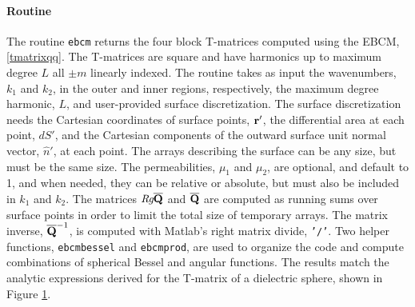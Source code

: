 \begin{figure}[H]
   \label{ebcmcompare}
\end{figure}


\clearpage
\paragraph{Routine}

The routine \texttt{ebcm} returns the four block T-matrices computed using the EBCM, \eqref{tmatrixqq}. The T-matrices are square and have harmonics up to maximum degree $L$ all $\pm m$ linearly indexed. The routine takes as input the wavenumbers, $k_1$ and $k_2$, in the outer and inner regions, respectively, the maximum degree harmonic, $L$, and user-provided surface discretization. The surface discretization needs the Cartesian coordinates of surface points, $\mathbf{r}'$, the differential area at each point, $dS'$, and the Cartesian components of the outward surface unit normal vector, $\hat{n}'$, at each point. The arrays describing the surface can be any size, but must be the same size. The permeabilities, $\mu_1$ and $\mu_2$, are optional, and default to 1, and when needed, they can be relative or absolute, but must also be included in $k_1$ and $k_2$. The matrices $\textit{Rg}\overline{\mathbf{Q}}$ and $\overline{\mathbf{Q}}$ are computed as running sums over surface points in order to limit the total size of temporary arrays. The matrix inverse, $\overline{\mathbf{Q}}^{-1}$, is computed with Matlab's right matrix divide, \texttt{'/'}.  Two helper functions, \texttt{ebcmbessel} and \texttt{ebcmprod}, are used to organize the code and compute combinations of spherical Bessel and angular functions. The results match the analytic expressions derived for the T-matrix of a dielectric sphere, shown in Figure \ref{ebcmcompare}. 


{\footnotesize
{}
}


